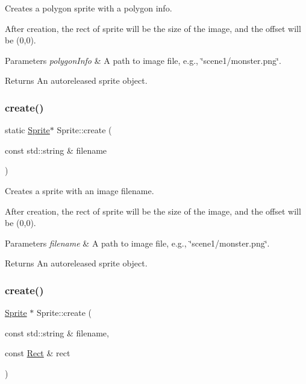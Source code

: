 Creates a polygon sprite with a polygon info.

After creation, the rect of sprite will be the size of the image, and the offset will be (0,0).


\begin{DoxyParams}{Parameters}
{\em polygon\+Info} & A path to image file, e.\+g., \char`\"{}scene1/monster.\+png\char`\"{}. \\
\hline
\end{DoxyParams}
\begin{DoxyReturn}{Returns}
An autoreleased sprite object. 
\end{DoxyReturn}
\mbox{\label{classSprite_ad07599ae8d827884180984bfe037929d}} 
\subsubsection{\texorpdfstring{create()}{create()}\hspace{0.1cm}{\footnotesize\ttfamily [5/8]}}
{\footnotesize\ttfamily static \hyperlink{classSprite}{Sprite}$\ast$ Sprite\+::create (\begin{DoxyParamCaption}\item[{const std\+::string \&}]{filename }\end{DoxyParamCaption})\hspace{0.3cm}{\ttfamily [static]}}

Creates a sprite with an image filename.

After creation, the rect of sprite will be the size of the image, and the offset will be (0,0).


\begin{DoxyParams}{Parameters}
{\em filename} & A path to image file, e.\+g., \char`\"{}scene1/monster.\+png\char`\"{}. \\
\hline
\end{DoxyParams}
\begin{DoxyReturn}{Returns}
An autoreleased sprite object. 
\end{DoxyReturn}
\mbox{\label{classSprite_ab076431dfa6f2bd840fee3eba1c5b287}} 
\subsubsection{\texorpdfstring{create()}{create()}\hspace{0.1cm}{\footnotesize\ttfamily [6/8]}}
{\footnotesize\ttfamily \hyperlink{classSprite}{Sprite} $\ast$ Sprite\+::create (\begin{DoxyParamCaption}\item[{const std\+::string \&}]{filename,  }\item[{const \hyperlink{classRect}{Rect} \&}]{rect }\end{DoxyParamCaption})\hspace{0.3cm}{\ttfamily [static]}}


